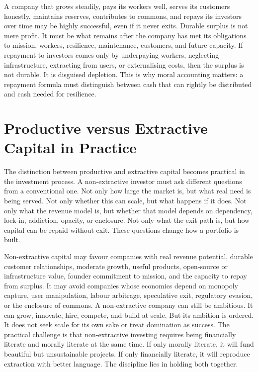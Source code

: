 \documentclass[11pt,a4paper,oneside]{book}
\begin{document}
A company that grows steadily, pays its workers well, serves its customers honestly, maintains reserves, contributes to commons, and repays its investors over time may be highly successful, even if it never exits. Durable surplus is not mere profit. It must be what remains after the company has met its obligations to mission, workers, resilience, maintenance, customers, and future capacity. If repayment to investors comes only by underpaying workers, neglecting infrastructure, extracting from users, or externalising costs, then the surplus is not durable. It is disguised depletion. This is why moral accounting matters: a repayment formula must distinguish between cash that can rightly be distributed and cash needed for resilience.

\section*{Productive versus Extractive Capital in Practice}

The distinction between productive and extractive capital becomes practical in the investment process. A non-extractive investor must ask different questions from a conventional one. Not only how large the market is, but what real need is being served. Not only whether this can scale, but what happens if it does. Not only what the revenue model is, but whether that model depends on dependency, lock-in, addiction, opacity, or enclosure. Not only what the exit path is, but how capital can be repaid without exit. These questions change how a portfolio is built.

Non-extractive capital may favour companies with real revenue potential, durable customer relationships, moderate growth, useful products, open-source or infrastructure value, founder commitment to mission, and the capacity to repay from surplus. It may avoid companies whose economics depend on monopoly capture, user manipulation, labour arbitrage, speculative exit, regulatory evasion, or the enclosure of commons. A non-extractive company can still be ambitious. It can grow, innovate, hire, compete, and build at scale. But its ambition is ordered. It does not seek scale for its own sake or treat domination as success. The practical challenge is that non-extractive investing requires being financially literate and morally literate at the same time. If only morally literate, it will fund beautiful but unsustainable projects. If only financially literate, it will reproduce extraction with better language. The discipline lies in holding both together.
\end{document}
